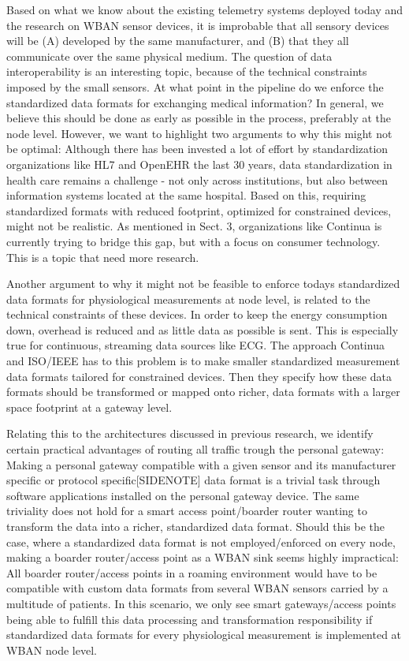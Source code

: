 Based on what we know about the existing telemetry systems deployed today and the research on WBAN sensor devices, it is improbable that all sensory devices will be (A) developed by the same manufacturer, and (B) that they all communicate over the same physical medium. The question of data interoperability is an interesting topic, because of the technical constraints imposed by the small sensors. At what point in the pipeline do we enforce the standardized data formats for exchanging medical information? In general, we believe this should be done as early as possible in the process, preferably at the node level. However, we want to highlight two arguments to why this might not be optimal: Although there has been invested a lot of effort by standardization organizations like HL7 and OpenEHR the last 30 years, data standardization in health care remains a challenge - not only across institutions, but also between information systems located at the same hospital. Based on this, requiring standardized formats with reduced footprint, optimized for constrained devices, might not be realistic. As mentioned in Sect. 3, organizations like Continua is currently trying to bridge this gap, but with a focus  on consumer technology. This is a topic that need more research.

Another argument to why it might not be feasible to enforce todays standardized data formats for physiological measurements at node level, is related to the technical constraints of these devices. In order to keep the energy consumption down, overhead is reduced and as little data as possible is sent. This is especially true for continuous, streaming data sources like ECG. The approach Continua and ISO/IEEE has to this problem is to make smaller standardized measurement data formats tailored for constrained devices. Then they specify how these data formats should be transformed or mapped onto richer, data formats with a larger space footprint at a gateway level.

Relating this to the architectures discussed in previous research, we identify certain practical advantages of routing all traffic trough the personal gateway: Making a personal gateway compatible with a given sensor and its manufacturer specific or protocol specific[SIDENOTE] data format is a trivial task through software applications installed on the personal gateway device. The same triviality does not hold for a smart access point/boarder router wanting to transform the data into a richer, standardized data format. Should this be the case, where a standardized data format is not employed/enforced on every node, making a boarder router/access point as a WBAN sink seems highly impractical: All boarder router/access points in a roaming environment would have to be compatible with custom data formats from several WBAN sensors carried by a multitude of patients. In this scenario, we only see smart gateways/access points being able to fulfill this data processing and transformation responsibility if standardized data formats for every physiological measurement is implemented at WBAN node level.

